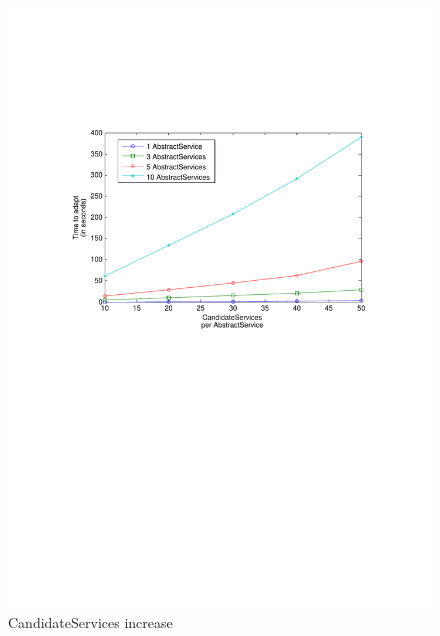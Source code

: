 \documentclass[10pt,journal,compsoc]{IEEEtran}
\begin{document}
\begin{figure}[htbp]
  \centering
	\includegraphics[clip, trim=2cm 14.2cm 2cm 6cm, scale=0.42]{graphs/1_3_5_10_task_per_svc_scaling.pdf}
	\caption{CandidateServices increase \label{fig:task_per_svc}}
\end{figure}
\end{document}
